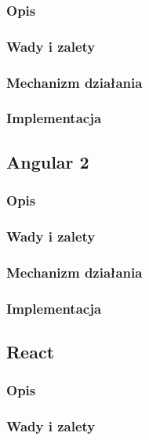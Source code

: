 \documentclass[polish, twoside, 12pt]{mwart}
\begin{document}
\subsubsection{Opis}

\subsubsection{Wady i zalety}

\subsubsection{Mechanizm działania}

\subsubsection{Implementacja}

\subsection{Angular 2}

\subsubsection{Opis}

\subsubsection{Wady i zalety}

\subsubsection{Mechanizm działania}

\subsubsection{Implementacja}

\subsection{React}

\subsubsection{Opis}

\subsubsection{Wady i zalety}
\end{document}
